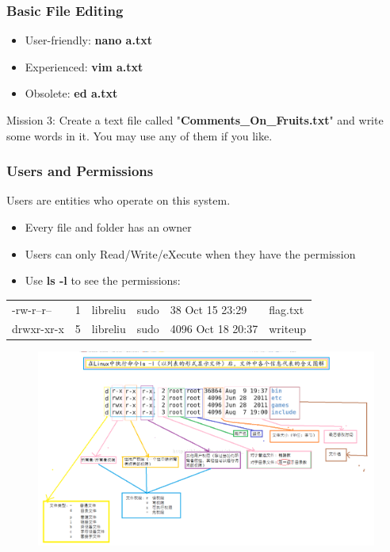 \documentclass[11pt]{beamer}
\begin{document}
\begin{frame}
\frametitle{Basic File Editing}
\begin{itemize}
\item User-friendly: \textbf{nano a.txt}
\item Experienced: \textbf{vim a.txt}
\item Obsolete: \textbf{ed a.txt}
\end{itemize}
Mission 3: Create a text file called "\textbf{Comments\_On\_Fruits.txt}" and write some words in it. You may use any of them if you like.
\end{frame}

\begin{frame}
\frametitle{Users and Permissions}
Users are entities who operate on this system.
\begin{itemize}
\item Every file and folder has an owner
\item Users can only Read/Write/eXecute when they have the permission
\item Use \textbf{ls -l} to see the permissions:\\
\end{itemize}
\begin{tabular}{llllll}
-rw-r--r-- & 1 & libreliu & sudo  &        38 Oct 15 23:29 & flag.txt\\
drwxr-xr-x &  5  & libreliu & sudo &       4096 Oct 18 20:37 & writeup\\
\end{tabular}


\end{frame}

\begin{frame}
\begin{figure}
\includegraphics[width=\textwidth]{ls_description.png}
\end{figure}
\end{frame}
\end{document}
